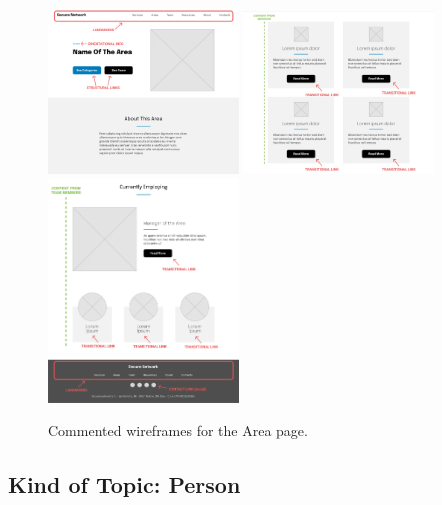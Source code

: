 \documentclass[12pt]{report}
\begin{document}
\begin{figure}[H]
	\centering
	\includegraphics[width=0.45\textwidth]{low_fid_wireframes/area/1.png}
	\includegraphics[width=0.45\textwidth]{low_fid_wireframes/area/2.png}
	\includegraphics[width=0.45\textwidth]{low_fid_wireframes/area/3.png}
	\caption{Commented wireframes for the Area page.}
\end{figure}

\subsection{Kind of Topic: Person}
\end{document}
